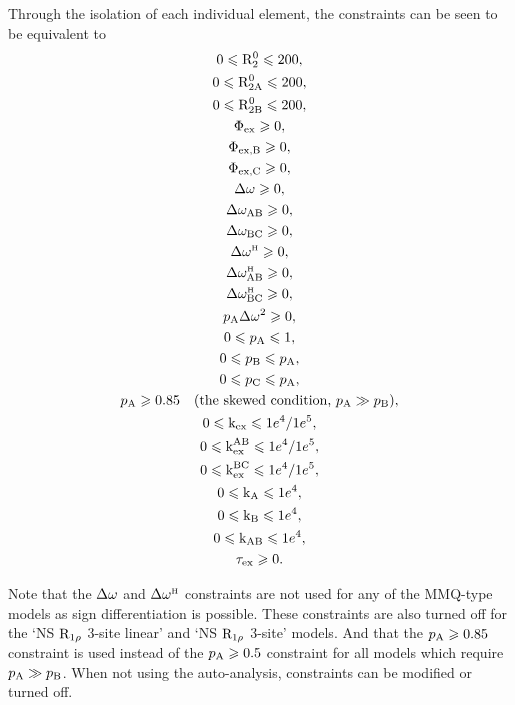 \noindent  Through the isolation of each individual element, the constraints can be seen to be equivalent to
\begin{subequations}
\begin{gather} 
    0 \leqslant \mathrm{R}_2^0 \leqslant 200, \\
    0 \leqslant \mathrm{R}_{\mathrm{2A}}^0 \leqslant 200, \\
    0 \leqslant \mathrm{R}_{\mathrm{2B}}^0 \leqslant 200, \\
    \Phi_{\textrm{ex}} \geqslant 0, \\
    \Phi_{\textrm{ex,B}} \geqslant 0, \\
    \Phi_{\textrm{ex,C}} \geqslant 0, \\
    \Delta\omega \geqslant 0, \\
    \Delta\omega_{\textrm{AB}} \geqslant 0, \\
    \Delta\omega_{\textrm{BC}} \geqslant 0, \\
    \Delta\omega^{\scriptscriptstyle\mathrm{H}} \geqslant 0, \\
    \Delta\omega^{\scriptscriptstyle\mathrm{H}}_{\textrm{AB}} \geqslant 0, \\
    \Delta\omega^{\scriptscriptstyle\mathrm{H}}_{\textrm{BC}} \geqslant 0, \\
    p_{\textrm{A}}\Delta\omega^2 \geqslant 0, \\
    0 \leqslant p_{\textrm{A}} \leqslant 1, \\
    0 \leqslant p_{\textrm{B}} \leqslant p_{\textrm{A}}, \\
    0 \leqslant p_{\textrm{C}} \leqslant p_{\textrm{A}}, \\
    p_{\textrm{A}} \geqslant 0.85 \quad (\textrm{the skewed condition, } p_{\textrm{A}} \gg p_{\textrm{B}}), \\
    0 \leqslant \textrm{k}_{\textrm{ex}} \leqslant 1e^4 / 1e^5, \\
    0 \leqslant \textrm{k}_{\textrm{ex}}^{\textrm{AB}} \leqslant 1e^4 / 1e^5, \\
    0 \leqslant \textrm{k}_{\textrm{ex}}^{\textrm{BC}} \leqslant 1e^4 / 1e^5, \\
    0 \leqslant \textrm{k}_{\textrm{A}} \leqslant 1e^4, \\
    0 \leqslant \textrm{k}_{\textrm{B}} \leqslant 1e^4, \\
    0 \leqslant \textrm{k}_{\textrm{AB}} \leqslant 1e^4, \\
    \tau_{\textrm{ex}} \geqslant 0.
\end{gather} 
\end{subequations}

Note that the $\Delta\omega$ and $\Delta\omega^{\scriptscriptstyle\mathrm{H}}$ constraints are not used for any of the MMQ-type models as sign differentiation is possible.
These constraints are also turned off for the `NS $\mathrm{R}_{1\rho}$ 3-site linear' and `NS $\mathrm{R}_{1\rho}$ 3-site' models.
And that the $p_{\textrm{A}} \geqslant 0.85$ constraint is used instead of the $p_{\textrm{A}} \geqslant 0.5$ constraint for all models which require $p_{\textrm{A}} \gg p_{\textrm{B}}$.
When not using the auto-analysis, constraints can be modified or turned off.


